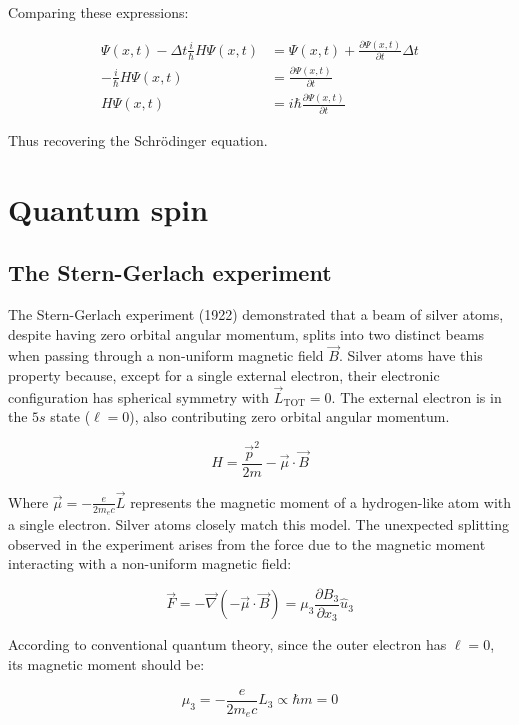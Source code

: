 \documentclass[italian]{HKNdocument}
\begin{document}
Comparing these expressions:

\begin{align}
\Psi(x, t)-\Delta t \frac{i}{\hbar} H \Psi(x, t) & =\Psi(x, t)+\frac{\partial \Psi(x, t)}{\partial t} \Delta t \\
-\frac{i}{\hbar} H \Psi(x, t) & =\frac{\partial \Psi(x, t)}{\partial t}  \label{eq:10.61}\\
H \Psi(x, t) & =i \hbar \frac{\partial \Psi(x, t)}{\partial t}
\end{align}

Thus recovering the Schrödinger equation.

\section{Quantum spin}
\subsection{The Stern-Gerlach experiment}
The Stern-Gerlach experiment (1922) demonstrated that a beam of silver atoms, despite having zero orbital angular momentum, splits into two distinct beams when passing through a non-uniform magnetic field $\vec{B}$. Silver atoms have this property because, except for a single external electron, their electronic configuration has spherical symmetry with $\vec{L}_{\text{TOT}}=0$. The external electron is in the $5s$ state ($\ell=0$), also contributing zero orbital angular momentum.


\begin{equation}
H=\frac{\vec{p}^{2}}{2 m}-\vec{\mu} \cdot \vec{B} \label{eq:11.1}
\end{equation}

Where $\vec{\mu}=-\frac{e}{2 m_{e} c} \vec{L}$ represents the magnetic moment of a hydrogen-like atom with a single electron. Silver atoms closely match this model. The unexpected splitting observed in the experiment arises from the force due to the magnetic moment interacting with a non-uniform magnetic field:

\begin{equation}
\vec{F}=-\vec{\nabla}(-\vec{\mu} \cdot \vec{B})=\mu_{3} \frac{\partial B_{3}}{\partial x_{3}} \hat{u}_{3} \label{eq:11.2}
\end{equation}

According to conventional quantum theory, since the outer electron has $\ell=0$, its magnetic moment should be:

\begin{equation}
\mu_{3}=-\frac{e}{2 m_{e} c} L_{3} \propto \hbar m=0 \label{eq:11.3}
\end{equation}
\end{document}
